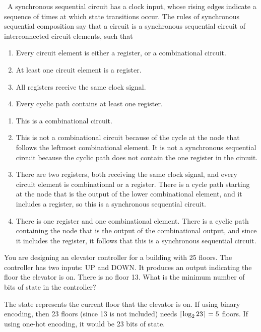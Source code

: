 \documentclass[12pt]{article}
\DeclarePairedDelimiter{\ceil}{\lceil}{\rceil}
\newenvironment{ex}[2][Exercise]{\begin{trivlist}
		\item[\hskip \labelsep {\bfseries #1}\hskip \labelsep {\bfseries #2.}]}{\end{trivlist}}
\newenvironment{sol}[1][Solution]{\begin{trivlist}
		\item[\hskip \labelsep {\bfseries #1:}]}{\end{trivlist}}
\begin{document}
\begin{sol}
	\
	A synchronous sequential circuit has a clock input, whose rising edges indicate a sequence of times at which
	state transitions occur. The rules of synchronous sequential composition say that a circuit is a
	synchronous sequential circuit of interconnected circuit elements, such that
	\begin{enumerate}
		\item Every circuit element is either a register, or a combinational circuit.
		\item At least one circuit element is a register.
		\item All registers receive the same clock signal.
		\item Every cyclic path contains at least one register.
	\end{enumerate}
	\begin{enumerate}[label=(\alph*)]
		\item This is a combinational circuit.
		\item This is not a combinational circuit because of the cycle at the node that follows the leftmost combinational element. It is not a synchronous sequential circuit because the cyclic path does not contain the one register in the circuit.
		\item There are two registers, both receiving the same clock signal, and every circuit element is combinational or a register. There is a cycle path starting at the node that is the output of the lower combinational element, and it includes a register, so this is a synchronous sequential circuit.
		\item There is one register and one combinational element. There is a cyclic path containing the node that is the output of the combinational output, and since it includes the register, it follows that this is a
		synchronous sequential circuit.
	\end{enumerate}
\end{sol}

\begin{ex}{3.19}
	You are designing an elevator controller for a building with 25 floors. The controller has two inputs:
	UP and DOWN. It produces an output indicating the floor the elevator is on. There is no floor 13. What is
	the minimum number of bits of state in the controller?
\end{ex}

\begin{sol}
	The state represents the current floor that the elevator is on. If using binary encoding, then 23 floors (since 13 is not included) needs $\ceil{\log_2{23}}=5$ floors. If using one-hot encoding, it would be 23 bits of state.
\end{sol}
\end{document}
